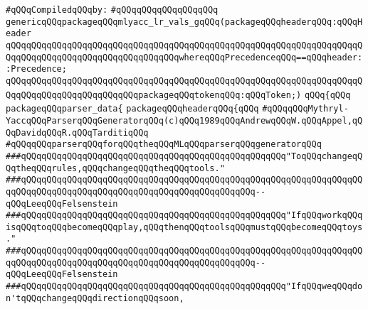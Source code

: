 \label{src/app/yacc/src/yacc.grammar.pkg}
\newline
\verb|#qQQqCompiledqQQqby:|\newline
\verb|#qQQqqQQqqQQqqQQqqQQq|\newline
\newline
\verb|genericqQQqpackageqQQqmlyacc_lr_vals_gqQQq(packageqQQqheaderqQQq:qQQqHeader|\newline
\verb|qQQqqQQqqQQqqQQqqQQqqQQqqQQqqQQqqQQqqQQqqQQqqQQqqQQqqQQqqQQqqQQqqQQqqQQqqQQqqQQqqQQqqQQqqQQqqQQqqQQqqQQqwhereqQQqPrecedenceqQQq==qQQqheader::Precedence;|\newline
\verb|qQQqqQQqqQQqqQQqqQQqqQQqqQQqqQQqqQQqqQQqqQQqqQQqqQQqqQQqqQQqqQQqqQQqqQQqqQQqqQQqqQQqqQQqqQQqqQQqpackageqQQqtokenqQQq:qQQqToken;)|\newline
\verb|qQQq{qQQq|\newline
\verb|packageqQQqparser_data{|\newline
\verb|packageqQQqheaderqQQq{qQQq|\newline
\verb|#qQQqqQQqMythryl-YaccqQQqParserqQQqGeneratorqQQq(c)qQQq1989qQQqAndrewqQQqW.qQQqAppel,qQQqDavidqQQqR.qQQqTarditiqQQq|\newline
\newline
\verb|#qQQqqQQqparserqQQqforqQQqtheqQQqMLqQQqparserqQQqgeneratorqQQq|\newline
\newline
\newline
\verb|###qQQqqQQqqQQqqQQqqQQqqQQqqQQqqQQqqQQqqQQqqQQqqQQqqQQq"ToqQQqchangeqQQqtheqQQqrules,qQQqchangeqQQqtheqQQqtools."|\newline
\verb|###qQQqqQQqqQQqqQQqqQQqqQQqqQQqqQQqqQQqqQQqqQQqqQQqqQQqqQQqqQQqqQQqqQQqqQQqqQQqqQQqqQQqqQQqqQQqqQQqqQQqqQQqqQQqqQQqqQQq--qQQqLeeqQQqFelsenstein|\newline
\newline
\newline
\verb|###qQQqqQQqqQQqqQQqqQQqqQQqqQQqqQQqqQQqqQQqqQQqqQQqqQQq"IfqQQqworkqQQqisqQQqtoqQQqbecomeqQQqplay,qQQqthenqQQqtoolsqQQqmustqQQqbecomeqQQqtoys."|\newline
\verb|###qQQqqQQqqQQqqQQqqQQqqQQqqQQqqQQqqQQqqQQqqQQqqQQqqQQqqQQqqQQqqQQqqQQqqQQqqQQqqQQqqQQqqQQqqQQqqQQqqQQqqQQqqQQqqQQqqQQq--qQQqLeeqQQqFelsenstein|\newline
\newline
\newline
\verb|###qQQqqQQqqQQqqQQqqQQqqQQqqQQqqQQqqQQqqQQqqQQqqQQqqQQq"IfqQQqweqQQqdon'tqQQqchangeqQQqdirectionqQQqsoon,|\newline

